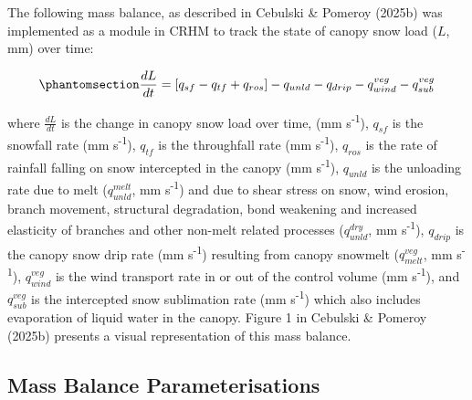 \documentclass[
]{agujournal2019}
\begin{document}
The following mass balance, as described in Cebulski \& Pomeroy (2025b)
was implemented as a module in CRHM to track the state of canopy snow
load (\(L\), mm) over time:

\begin{equation}\phantomsection\label{eq-canopy-mass-bal}{
\frac{dL}{dt} = 
[q_{sf} - q_{tf} + q_{ros}] - q_{unld} - q_{drip} - q_{wind}^{veg} - q_{sub}^{veg}
}\end{equation}

where \(\frac{dL}{dt}\) is the change in canopy snow load over time, (mm
s\textsuperscript{-1}), \(q_{sf}\) is the snowfall rate (mm
s\textsuperscript{-1}), \(q_{tf}\) is the throughfall rate (mm
s\textsuperscript{-1}), \(q_{ros}\) is the rate of rainfall falling on
snow intercepted in the canopy (mm s\textsuperscript{-1}), \(q_{unld}\)
is the unloading rate due to melt (\(q_{unld}^{melt}\), mm
s\textsuperscript{-1}) and due to shear stress on snow, wind erosion,
branch movement, structural degradation, bond weakening and increased
elasticity of branches and other non-melt related processes
(\(q_{unld}^{dry}\), mm s\textsuperscript{-1}), \(q_{drip}\) is the
canopy snow drip rate (mm s\textsuperscript{-1}) resulting from canopy
snowmelt (\(q_{melt}^{veg}\), mm s\textsuperscript{-1}),
\(q_{wind}^{veg}\) is the wind transport rate in or out of the control
volume (mm s\textsuperscript{-1}), and \(q_{sub}^{veg}\) is the
intercepted snow sublimation rate (mm s\textsuperscript{-1}) which also
includes evaporation of liquid water in the canopy. Figure 1 in Cebulski
\& Pomeroy (2025b) presents a visual representation of this mass
balance.

\subsection{Mass Balance
Parameterisations}\label{mass-balance-parameterisations}
\end{document}
